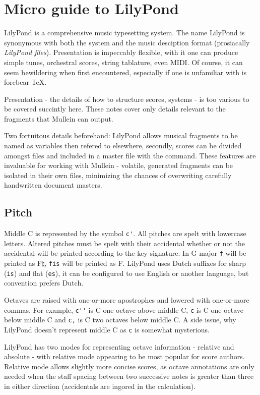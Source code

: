 \documentclass{article}
\begin{document}
\section{Micro guide to LilyPond}
LilyPond is a comprehensive music typesetting system. The name 
LilyPond is synonymous with both the system and the music 
desciption format (prosiacally \emph{LilyPond files}).
Presentation is impeccably flexible, with it one can produce 
simple tunes, orchestral scores, string tablature, even MIDI. Of 
course, it can seem bewildering when first encountered, 
especially if one is unfamiliar with is forebear \TeX.

Presentation - the details of how to structure scores, systems - 
is too various to be covered succintly here. These notes cover 
only details relevant to the fragments that Mullein can output.

Two fortuitous details beforehand: LilyPond allows musical 
fragments to be named as variables then refered to elsewhere,
secondly, scores can be divided amongst files and included in a
master file with the \verb++ command. These features are 
invaluable for working with Mullein - volatile, generated 
fragments can be isolated in their own files, minimizing the 
chances of overwriting carefully handwritten document masters.
 
\subsection{Pitch}
Middle C is represented by the symbol \verb+c'+. All pitches 
are spelt with lowercase letters. Altered pitches must 
be spelt with their accidental whether or not the accidental 
will be printed according to the key signature. In G major
\verb+f+ will be printed as F$\natural$, \verb+fis+ will be
printed as F. LilyPond uses Dutch suffixes for sharp 
(\verb+is+) and flat (\verb+es+), it can be configured to use
English or another language, but convention prefers Dutch.

Octaves are raised with one-or-more apostrophes and lowered 
with one-or-more commas. For example, \verb+c''+ is C one octave 
above middle C, \verb+c+ is C one octave below middle C and 
\verb+c,+ is C two octaves below middle C. A side issue, why 
LilyPond doesn't represent middle C as \verb+c+ is somewhat 
mysterious.

LilyPond has two modes for representing octave information - 
relative and absolute - with relative mode appearing to be most 
popular for score authors. Relative mode allows slightly more 
concise scores, as octave annotations are only needed when the 
staff spacing between two successive notes is greater than three 
in either direction (accidentals are ingored in the calculation).
\end{document}
